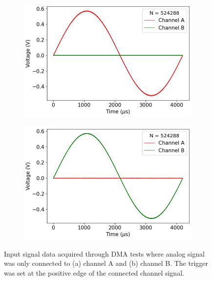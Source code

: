 \begin{figure}[ht]
    \centering
    \begin{subfigure}[t]{0.47\linewidth}
        \centering
        \includegraphics[width=\textwidth]{images/chapter_2/2_dma/scpi_a_v.png}
        \caption{}
        \label{fig:ch2_scpi_a_v}
    \end{subfigure}
    \hspace{.025\linewidth}
    \begin{subfigure}[t]{0.47\linewidth}
        \centering
        \includegraphics[width=\textwidth]{images/chapter_2/2_dma/scpi_b_v.png}
        \caption{}
        \label{fig:ch2_scpi_b_v}
    \end{subfigure}
    \caption{Input signal data acquired through DMA tests where analog signal was only connected to (a) channel A and (b) channel B. The trigger was set at the positive edge of the connected channel signal.}
    \label{fig:ch2_dma}
\end{figure}

